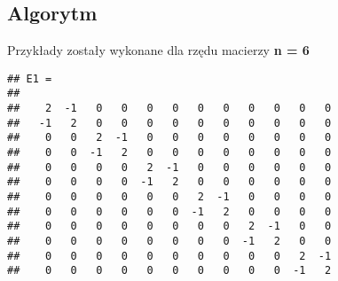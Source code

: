 	\subsection{Algorytm}
		Przykłady zostały wykonane dla rzędu macierzy \textbf{n = 6}
		
\begin{samepage}
\begin{Shaded}
\begin{Highlighting}[]
\NormalTok{,}\NormalTok{;}
        
\NormalTok{A=[}\NormalTok{, -}\NormalTok{;-}\NormalTok{,}\NormalTok{];}
\NormalTok{B=[}\NormalTok{,-}\NormalTok{;}\NormalTok{,}\NormalTok{];}
\NormalTok{C=[}\NormalTok{,}\NormalTok{;}\NormalTok{,}\NormalTok{];}
        
\NormalTok{;}
        
\NormalTok{(}
\end{Highlighting}
\end{Shaded}
\end{samepage}
\begin{samepage}
\begin{verbatim}
## E1 =
## 
##    2  -1   0   0   0   0   0   0   0   0   0   0
##   -1   2   0   0   0   0   0   0   0   0   0   0
##    0   0   2  -1   0   0   0   0   0   0   0   0
##    0   0  -1   2   0   0   0   0   0   0   0   0
##    0   0   0   0   2  -1   0   0   0   0   0   0
##    0   0   0   0  -1   2   0   0   0   0   0   0
##    0   0   0   0   0   0   2  -1   0   0   0   0
##    0   0   0   0   0   0  -1   2   0   0   0   0
##    0   0   0   0   0   0   0   0   2  -1   0   0
##    0   0   0   0   0   0   0   0  -1   2   0   0
##    0   0   0   0   0   0   0   0   0   0   2  -1
##    0   0   0   0   0   0   0   0   0   0  -1   2
\end{verbatim}
\end{samepage}
\newpage
\begin{samepage}
\begin{Shaded}
	\begin{Highlighting}[]
\NormalTok{(}
	\end{Highlighting}
\end{Shaded}
\end{samepage}


